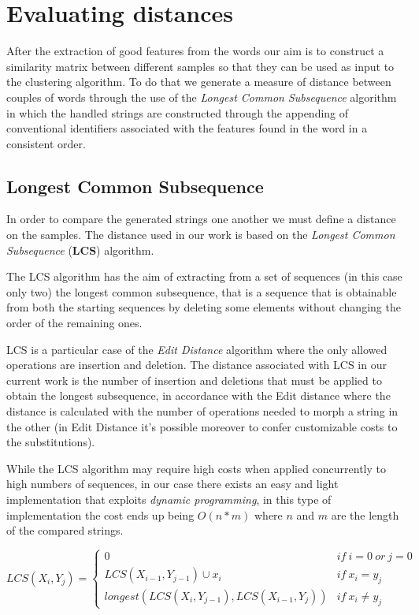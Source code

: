 \section{Evaluating distances}
After the extraction of good features from the words our aim is to construct a similarity matrix between different samples so that they can be used as input to the clustering algorithm. To do that we generate a measure of distance between couples of words through the use of the \emph{Longest Common Subsequence} algorithm in which the handled strings  are constructed through the appending of conventional identifiers associated with the features found in the word in a consistent order. 


\subsection{Longest Common Subsequence} 

In order to compare the generated strings one another we must define a distance on the samples.
The distance used in our work is based on the \emph{Longest Common Subsequence} (\textbf{LCS}) algorithm. 

The LCS algorithm has the aim of extracting from a set of sequences (in this case only two) the longest common subsequence, that is a sequence that is obtainable from both the starting sequences by deleting some elements without changing the order of the remaining ones.

LCS is a particular case of the \emph{Edit Distance} algorithm where the only allowed operations are insertion and deletion.
The distance associated with LCS in our current work is the number of insertion and deletions that must be applied to obtain the longest subsequence, in accordance with the Edit distance where the distance is calculated with the number of operations needed to morph a string in the other (in Edit Distance it's possible moreover to confer customizable costs to the substitutions).   

While the LCS algorithm may require high costs when applied concurrently to high numbers of sequences, in our case there exists an easy and light implementation that exploits \textit{dynamic programming}, in this type of implementation the cost ends up being $O(n*m)$ where $n$ and $m$ are the length of the compared strings.  


$$\label{LCS}
LCS(X_i,Y_j) =
 \left\{\begin{array}{ll}
 \displaystyle
 0 & if~i=0~ or~ j=0\\
 LCS(X_{i-1},Y_{j-1})\cup x_i & if~ x_i=y_j\\
 longest(LCS(X_i,Y_{j-1}), LCS(X_{i-1},Y_j)) & if~ x_i\neq y_j
 \end{array}\right.
$$



